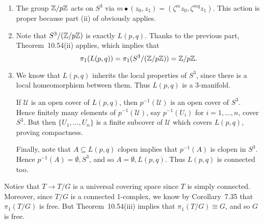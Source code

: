 \documentclass[../../solutions.tex]{subfiles}
\begin{document}
\begin{exercise} \leavevmode
\begin{enumerate}
\item
The group $\mathbb{Z}/p\mathbb{Z}$ acts on $S^3$ via $m\bullet(z_0,z_1)=(\zeta^mz_0,\zeta^{mq}z_1)$.
This action is proper because part (ii) of  obviously applies.

\item
Note that $S^3/(\mathbb{Z}/p\mathbb{Z})$ is exactly $L(p,q)$.
Thanks to the previous part, Theorem~10.54(ii) applies, which implies that
\[\pi_1(L(p,q))=\pi_1(S^3/(\mathbb{Z}/p\mathbb{Z}))=\mathbb{Z}/p\mathbb{Z}.\]

\item
We know that $L(p,q)$ inherits the local properties of $S^3$, since there is a local homeomorphism between them.
Thus $L(p,q)$ is a 3-manifold.

If $\mathcal U$ is an open cover of $L(p,q)$, then $p^{-1}(\mathcal U)$ is an open cover of $S^3$.
Hence finitely many elements of $p^{-1}(\mathcal U)$, say $p^{-1}(U_i)$ for $i=1,\dots,n$, cover $S^3$.
But then $\{U_1,\dots,U_n\}$ is a finite subcover of $\mathcal U$ which covers $L(p,q)$, proving compactness.

Finally, note that $A\subseteq L(p,q)$ clopen implies that $p^{-1}(A)$ is clopen in $S^3$.
Hence $p^{-1}(A)=\emptyset,S^3$, and so $A=\emptyset,L(p,q)$.
Thus $L(p,q)$ is connected too.
\end{enumerate}
\end{exercise}

\begin{exercise} \leavevmode
Notice that $T\to T/G$ is a universal covering space since $T$ is simply connected.
Moreover, since $T/G$ is a connected 1-complex, we know by Corollary~7.35 that $\pi_1(T/G)$ is free.
But Theorem~10.54(iii) implies that $\pi_1(T/G)\cong G$, and so $G$ is free.
\end{exercise}
\end{document}
